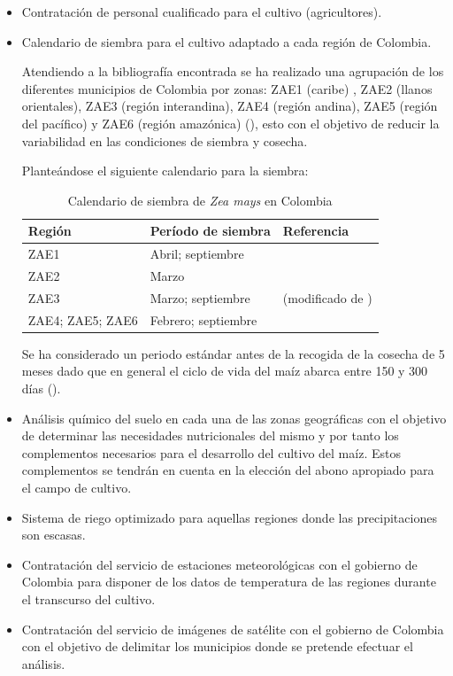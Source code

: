 \documentclass[12pt, spanish]{article}
\begin{document}
\begin{itemize}
    \item Contratación de personal cualificado para el cultivo (agricultores).
    \item Calendario de siembra para el cultivo adaptado a cada región de Colombia.
    
Atendiendo a la bibliografía encontrada se ha realizado una agrupación de los diferentes municipios de Colombia por zonas: ZAE1 (caribe) , ZAE2 (llanos orientales), ZAE3 (región interandina), ZAE4 (región andina), ZAE5 (región del pacífico)  y ZAE6 (región amazónica) (\cite{FAO2006a}), esto con el objetivo de reducir la variabilidad en las condiciones de siembra y cosecha.

Planteándose el siguiente calendario para la siembra:

\begin{table}[h!]
    \centering
    \begin{tabular}{ |p{5cm}|p{5cm}|p{5cm}|  }
        \hline
        Región & Período de siembra & Referencia  \\
        \hline
        ZAE1 & Abril; septiembre &  \\
        ZAE2 & Marzo  &  \\
        ZAE3 & Marzo; septiembre & (modificado de \cite{FAO2006a})  \\
        ZAE4; ZAE5; ZAE6 & Febrero; septiembre &  \\
        \hline
    \end{tabular}
    \caption{Calendario de siembra de \textit{Zea mays} en Colombia}
    \label{tab:1}
\end{table}



Se ha considerado un periodo estándar antes de la recogida de la cosecha de 5 meses dado que en general el ciclo de vida del maíz abarca entre 150 y 300 días (\cite{Fisiomaizfenalce2011}).

\item Análisis químico del suelo en cada una de las zonas geográficas con el objetivo de determinar las necesidades nutricionales del mismo y por tanto los complementos necesarios para el desarrollo del cultivo del maíz. Estos complementos se tendrán en cuenta en la elección del abono apropiado para el campo de cultivo.

\item Sistema de riego optimizado para aquellas regiones donde las precipitaciones son escasas.

\item Contratación del servicio de estaciones meteorológicas con el gobierno de Colombia para disponer de los datos de temperatura de las regiones durante el transcurso del cultivo.

\item Contratación del servicio de imágenes de satélite con el gobierno de Colombia con el objetivo de delimitar los municipios donde se pretende efectuar el análisis. 

\end{itemize}
\end{document}
